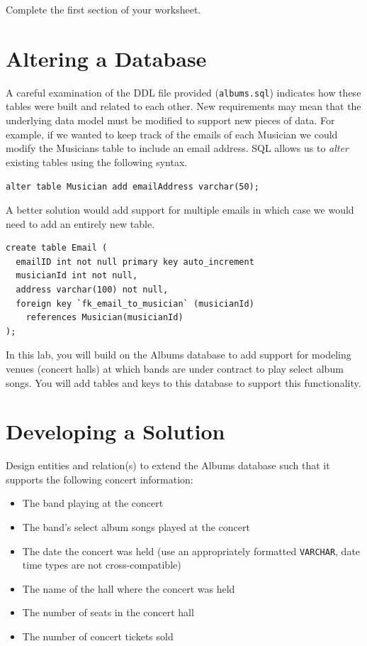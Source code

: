 \documentclass[12pt]{scrartcl}
\begin{document}
Complete the first section of your worksheet.

\section*{Altering a Database}

A careful examination of the DDL file provided (\texttt{albums.sql}) 
indicates how these tables were built and related to each other.  New 
requirements may mean that the underlying data model must be modified to 
support new pieces of data.  For example, if we wanted to keep track of the 
emails of each Musician we could modify the Musicians table to include an 
email address.  SQL allows us to \emph{alter} existing tables using
the following syntax.

\texttt{alter table Musician add emailAddress varchar(50);}

A better solution would add support for multiple emails in which case we 
would need to add an entirely new table.

\begin{verbatim}
create table Email (
  emailID int not null primary key auto_increment
  musicianId int not null,
  address varchar(100) not null,
  foreign key `fk_email_to_musician` (musicianId) 
    references Musician(musicianId)
);
\end{verbatim}

In this lab, you will build on the Albums database to add support 
for modeling venues (concert halls) at which bands are under 
contract to play select album songs. You will add tables and keys 
to this database to support this functionality.

\section*{Developing a Solution}

Design entities and relation(s) to extend the Albums database such 
that it supports the following concert information:

\begin{itemize}
  \item The band playing at the concert
  \item The band's select album songs played at the concert
  \item The date the concert was held (use an appropriately formatted 
    \texttt{VARCHAR}, date time types are not 
    cross-compatible) 
  \item The name of the hall where the concert was held
  \item The number of seats in the concert hall
  \item The number of concert tickets sold
\end{itemize}
\end{document}
